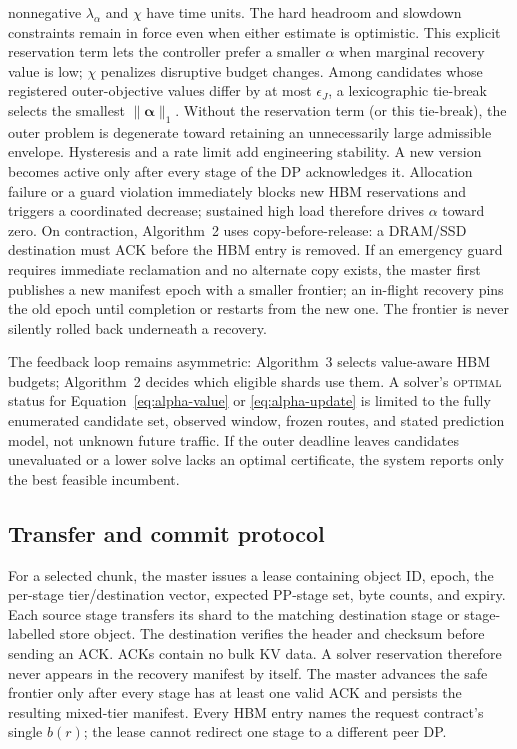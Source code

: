 nonnegative $\lambda_{\alpha}$ and $\chi$ have time units.  The hard headroom
and slowdown constraints remain in force even
when either estimate is optimistic.  This explicit reservation term lets the
controller prefer a smaller $\alpha$ when marginal recovery value is low;
$\chi$ penalizes disruptive budget changes.  Among candidates whose registered
outer-objective values differ by at most $\epsilon_J$, a lexicographic
tie-break selects the smallest $\lVert\boldsymbol\alpha\rVert_1$.  Without the
reservation term (or this tie-break), the outer problem is degenerate toward
retaining an unnecessarily large admissible envelope.  Hysteresis and a rate limit add
engineering stability.  A new version becomes active only after every stage of
the DP acknowledges it.  Allocation failure or a guard violation immediately
blocks new HBM reservations and triggers a coordinated decrease; sustained
high load therefore drives $\alpha$ toward zero.  On contraction, Algorithm~2
uses copy-before-release: a DRAM/SSD destination must
ACK before the HBM entry is removed.  If an emergency guard requires immediate
reclamation and no alternate copy exists, the master first publishes a new
manifest epoch with a smaller frontier; an in-flight recovery pins the old
epoch until completion or restarts from the new one.  The frontier is never
silently rolled back underneath a recovery.

The feedback loop remains asymmetric: Algorithm~3 selects value-aware HBM
budgets; Algorithm~2 decides which eligible shards use them.  A solver's
\textsc{optimal} status for Equation~\ref{eq:alpha-value} or
\ref{eq:alpha-update} is limited to the fully enumerated candidate set, observed
window, frozen routes, and stated prediction model, not unknown future traffic.
If the outer deadline leaves candidates unevaluated or a lower solve lacks an
optimal certificate, the system reports only the best feasible incumbent.

\subsection{Transfer and commit protocol}

For a selected chunk, the master issues a lease containing object ID, epoch,
the per-stage tier/destination vector, expected PP-stage set, byte counts, and
expiry.  Each source stage transfers its shard to the matching destination
stage or stage-labelled store object.  The destination verifies the header and
checksum before sending an ACK.  ACKs contain no bulk KV data.  A solver
reservation therefore never appears in the recovery manifest by itself.  The
master advances the safe frontier only after every stage has at least one valid ACK
and persists the resulting mixed-tier manifest.  Every HBM entry names the
request contract's single $b(r)$; the lease cannot redirect one stage to a
different peer DP.

